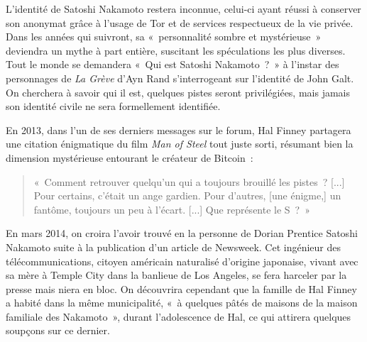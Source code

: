 
L'identité de Satoshi Nakamoto restera inconnue, celui-ci ayant réussi à conserver son anonymat grâce à l'usage de Tor et de services respectueux de la vie privée. Dans les années qui suivront, sa «~personnalité sombre et mystérieuse~» deviendra un mythe à part entière, suscitant les spéculations les plus diverses. Tout le monde se demandera «~Qui est Satoshi Nakamoto~?~» à l'instar des personnages de \emph{La Grève} d'Ayn Rand s'interrogeant sur l'identité de John Galt. On cherchera à savoir qui il est, quelques pistes seront privilégiées, mais jamais son identité civile ne sera formellement identifiée.

En 2013, dans l'un de ses derniers messages sur le forum, Hal Finney partagera une citation énigmatique du film \emph{Man of Steel} tout juste sorti, résumant bien la dimension mystérieuse entourant le créateur de Bitcoin~:

\begin{quote}
«~Comment retrouver quelqu'un qui a toujours brouillé les pistes~? [...] Pour certains, c'était un ange gardien. Pour d'autres, [une énigme,] un fantôme, toujours un peu à l'écart. [...] Que représente le S~?~» %
\end{quote} 

En mars 2014, on croira l'avoir trouvé en la personne de Dorian Prentice Satoshi Nakamoto suite à la publication d'un article de Newsweek. Cet ingénieur des télécommunications, citoyen américain naturalisé d'origine japonaise, vivant avec sa mère à Temple City dans la banlieue de Los Angeles, se fera harceler par la presse mais niera en bloc. On découvrira cependant que la famille de Hal Finney a habité dans la même municipalité, «~à quelques pâtés de maisons de la maison familiale des Nakamoto~», durant l'adolescence de Hal, ce qui attirera quelques soupçons sur ce dernier.

